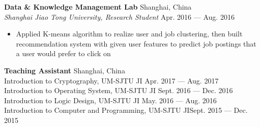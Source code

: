 \documentclass[margin,line,10pt]{res}
\begin{document}
\begin{resume}
{\small
{\bf\normalsize Data \& Knowledge Management Lab}   \hfill Shanghai, China\\
{\it Shanghai Jiao Tong University, Research Student} \hfill Apr. 2016 --- Aug. 2016
}
\begin{itemize}
\setlength{\itemsep}{0pt}
\setlength{\parskip}{0pt}
\setlength{\parsep}{0pt}
\item {\small Applied K-means algorithm to realize user and job clustering, then built recommendation system with given user features to predict job postings that a user would prefer to click on}
\end{itemize}

{
\small
{\bf\normalsize Teaching Assistant} \hfill Shanghai, China\\
{Introduction to Cryptography, UM-SJTU JI} \hfill Apr. 2017 --- Aug. 2017\\
{Introduction to Operating System, UM-SJTU JI} \hfill Sept. 2016 --- Dec. 2016\\
{Introduction to Logic Design, UM-SJTU JI} \hfill May. 2016 --- Aug. 2016 \\
{Introduction to Computer and Programming, UM-SJTU JI}\hfill Sept. 2015 --- Dec. 2015
}



\end{resume}
\end{document}
